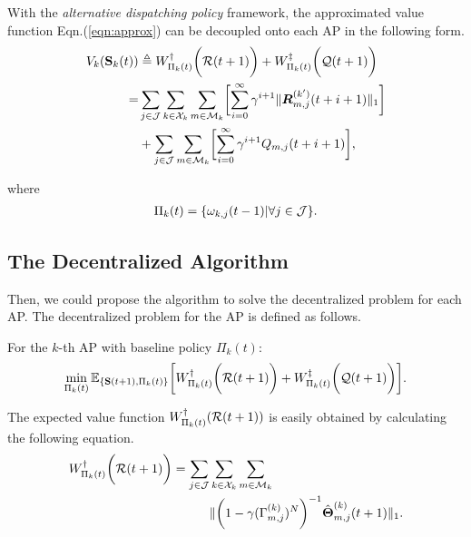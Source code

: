 \begin{lemma}
    With the \emph{alternative dispatching policy} framework, the approximated value function Eqn.(\ref{eqn:approx}) can be decoupled onto each AP in the following form.
    \begin{align}
        V_{k}(\Stat_{k}(t)) &\define W^{\AP}_{\Pi_{k}(t)}\Paren{\mathcal{R}(t+1)} + W^{\ES}_{\Pi_{k}(t)}\Paren{\mathcal{Q}(t+1)}
        \nonumber\\
        =& \sum_{j\in\jSpace}\sum_{k\in\ccSet_{k}}\sum_{m\in\esSet_{k}} \Bracket{
            \sum_{i=0}^{\infty} \gamma^{i+1} \Inorm{ \vecG{R}^{(k')}_{m,j}(t+i+1) }
        }
        \nonumber\\
        & + \sum_{j\in\jSpace}\sum_{m\in\esSet_{k}} \Bracket{
            \sum_{i=0}^{\infty} \gamma^{i+1} Q_{m,j}(t+i+1)
        },
    \end{align}
\end{lemma}
where
\begin{align}
    \Pi_{k}(t) = \{\omega_{k,j}(t-1)|\forall j\in\mathcal{J}\}.
\end{align}

\subsection{The Decentralized Algorithm}
Then, we could propose the algorithm to solve the decentralized problem for each AP.
The decentralized problem for the AP is defined as follows.
\begin{problem}
    For the $k$-th AP with baseline policy $\Pi_{k}(t)$:
    \begin{align}
        \min_{\Pi_{k}(t)} \mathbb{E}_{\{ \mathbf{S}(t+1), \Pi_{k}(t) \}} \bigg[
            W^{\dagger}_{\Pi_{k}(t)}\bigg(\mathcal{R}(t+1)\bigg) + W^{\ddagger}_{\Pi_{k}(t)}\bigg(\mathcal{Q}(t+1)\bigg)
        \bigg].
        \label{eqn:partial}
    \end{align}
\end{problem}

The expected value function $W^{\dagger}_{\Pi_{k}(t)}(\mathcal{R}(t+1))$ is easily obtained by calculating the following equation.
\begin{align}
    W^{\dagger}_{\Pi_{k}(t)}\bigg(\mathcal{R}(t+1)\bigg) = \sum_{j\in\mathcal{J}}&\sum_{k\in\mathcal{X}_{k}}\sum_{m\in\mathcal{M}_{k}}
    \nonumber\\
    &\lVert
        \bigg( 1 - \gamma ({\Gamma}^{(k)}_{m,j})^{N} \bigg)^{-1} \hat{\boldsymbol{\Theta}}^{(k)}_{m,j}(t+1)
    \|_1.
    \label{w_ap}
\end{align}

